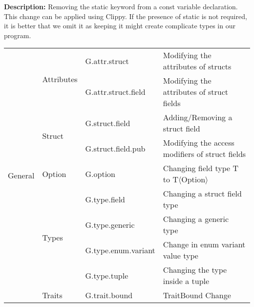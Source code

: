 \noindent \textbf{Description:} Removing the static keyword from a const variable declaration. This change can be applied using Clippy. If the presence of static is not required, it is better that we omit it as keeping it might create complicate types in our program.



\begin{table}[]

\begin{tabular}{|l|l|l|l|}
\hline

\multirow{10}{*}{General}        
& \multirow{2}{*}{Attributes}    & G.attr.struct  & Modifying the attributes of structs                                        \\
                                 &                                & G.attr.struct.field  & Modifying the attributes of struct fields                                  \\\cline{2-3}
                                 & \multirow{2}{*}{Struct}        & G.struct.field  & Adding/Removing a struct field                                      \\
                                 &                                & G.struct.field.pub  & Modifying the access modifiers of struct fields     
                                  \\\cline{2-3}
                                 & Option                         & G.option  & Changing field type T to T$\langle$Option$\rangle$                     \\\cline{2-3}
                                 & \multirow{4}{*}{Types}         & G.type.field  & Changing a struct field type                                        \\
                                 &                                & G.type.generic  & Changing a generic type                                             \\
                                 &                                & G.type.enum.variant  & Change in enum variant value type                                   \\
                                 &                                & G.type.tuple & Changing the type inside a tuple                                         \\\cline{2-3}
                                 & \multirow{1}{*}{Traits}        & G.trait.bound & TraitBound Change                                               \\\cline{1-3}

\end{tabular}
\end{table}
